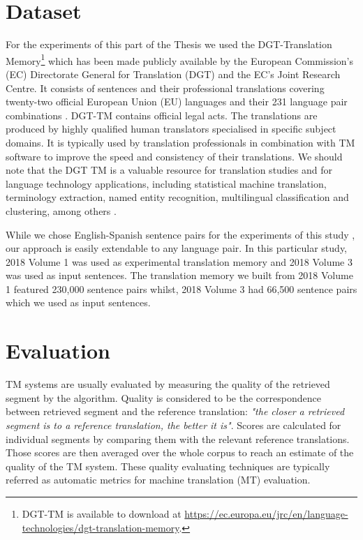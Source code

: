 \section{Dataset}
\label{sec:tm_data}
For the experiments of this part of the Thesis we used the DGT-Translation Memory\footnote{DGT-TM is available to download at \url{https://ec.europa.eu/jrc/en/language-technologies/dgt-translation-memory}.} which has been made publicly available by the European Commission’s (EC) Directorate General for Translation (DGT) and the EC’s Joint Research Centre. It consists of sentences and their professional translations covering twenty-two official European Union (EU) languages and their 231 language pair combinations \cite{steinberger-etal-2012-dgt}. DGT-TM contains official legal acts. The translations are produced by highly qualified human translators specialised in specific subject domains. It is typically used by translation professionals in combination with TM software to improve the speed and consistency of their translations. We should note that the DGT TM is a valuable resource for translation studies and for language technology applications, including statistical machine translation, terminology extraction, named entity recognition, multilingual classification and clustering, among others \cite{aker-etal-2013-extracting, besacier-schwartz-2015-automated}. 

While we chose English-Spanish sentence pairs for the experiments of this study , our approach is easily extendable to any language pair. In this particular study, 2018 Volume 1 was used as experimental translation memory and 2018 Volume 3 was used as input sentences. The translation memory we built from 2018 Volume 1 featured 230,000 sentence pairs whilst, 2018 Volume 3 had 66,500 sentence pairs which we used as input sentences. 

\section{Evaluation}
\label{sec:tm_eval}
TM systems are usually evaluated by measuring the quality of the retrieved segment by the algorithm. Quality is considered to be the correspondence between retrieved segment and the reference translation: \textit{"the closer a retrieved segment is to a reference translation, the better it is"}. Scores are calculated for individual segments by comparing them with the relevant reference translations.  Those scores are then averaged over the whole corpus to reach an estimate of the quality of the TM system. These quality evaluating techniques are typically referred as automatic metrics for machine translation (MT) evaluation.

